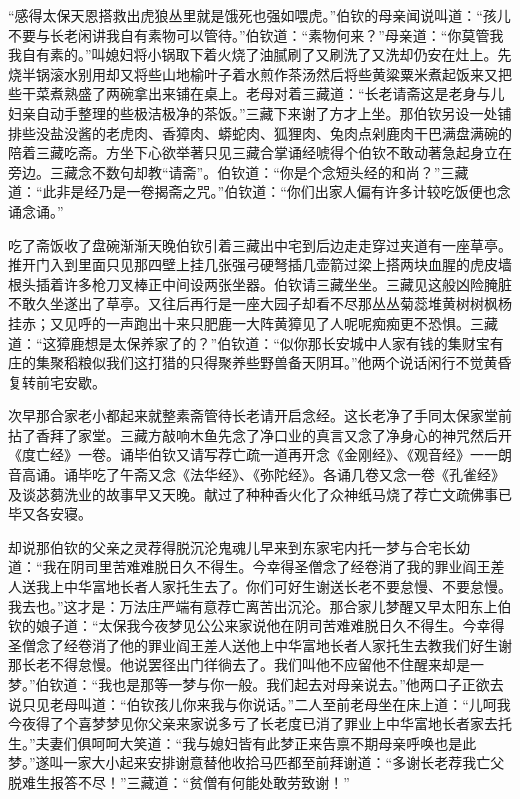 \documentclass[12pt,UTF8]{ctexbook}
\begin{document}
{“感得太保天恩搭救出虎狼丛里就是饿死也强如喂虎。”伯钦的母亲闻说叫道：“孩儿不要与长老闲讲我自有素物可以管待。”伯钦道：“素物何来？”母亲道：“你莫管我我自有素的。”叫媳妇将小锅取下着火烧了油腻刷了又刷洗了又洗却仍安在灶上。先烧半锅滚水别用却又将些山地榆叶子着水煎作茶汤然后将些黄粱粟米煮起饭来又把些干菜煮熟盛了两碗拿出来铺在桌上。老母对着三藏道：“长老请斋这是老身与儿妇亲自动手整理的些极洁极净的茶饭。”三藏下来谢了方才上坐。那伯钦另设一处铺排些没盐没酱的老虎肉、香獐肉、蟒蛇肉、狐狸肉、兔肉点剁鹿肉干巴满盘满碗的陪着三藏吃斋。方坐下心欲举著只见三藏合掌诵经唬得个伯钦不敢动著急起身立在旁边。三藏念不数句却教“请斋”。伯钦道：“你是个念短头经的和尚？”三藏道：“此非是经乃是一卷揭斋之咒。”伯钦道：“你们出家人偏有许多计较吃饭便也念诵念诵。”

吃了斋饭收了盘碗渐渐天晚伯钦引着三藏出中宅到后边走走穿过夹道有一座草亭。推开门入到里面只见那四壁上挂几张强弓硬弩插几壶箭过梁上搭两块血腥的虎皮墙根头插着许多枪刀叉棒正中间设两张坐器。伯钦请三藏坐坐。三藏见这般凶险腌脏不敢久坐遂出了草亭。又往后再行是一座大园子却看不尽那丛丛菊蕊堆黄树树枫杨挂赤；又见呼的一声跑出十来只肥鹿一大阵黄獐见了人呢呢痴痴更不恐惧。三藏道：“这獐鹿想是太保养家了的？”伯钦道：“似你那长安城中人家有钱的集财宝有庄的集聚稻粮似我们这打猎的只得聚养些野兽备天阴耳。”他两个说话闲行不觉黄昏复转前宅安歇。

次早那合家老小都起来就整素斋管待长老请开启念经。这长老净了手同太保家堂前拈了香拜了家堂。三藏方敲响木鱼先念了净口业的真言又念了净身心的神咒然后开《度亡经》一卷。诵毕伯钦又请写荐亡疏一道再开念《金刚经》、《观音经》一一朗音高诵。诵毕吃了午斋又念《法华经》、《弥陀经》。各诵几卷又念一卷《孔雀经》及谈苾蒭洗业的故事早又天晚。献过了种种香火化了众神纸马烧了荐亡文疏佛事已毕又各安寝。

却说那伯钦的父亲之灵荐得脱沉沦鬼魂儿早来到东家宅内托一梦与合宅长幼道：“我在阴司里苦难难脱日久不得生。今幸得圣僧念了经卷消了我的罪业阎王差人送我上中华富地长者人家托生去了。你们可好生谢送长老不要怠慢、不要怠慢。我去也。”这才是：万法庄严端有意荐亡离苦出沉沦。那合家儿梦醒又早太阳东上伯钦的娘子道：“太保我今夜梦见公公来家说他在阴司苦难难脱日久不得生。今幸得圣僧念了经卷消了他的罪业阎王差人送他上中华富地长者人家托生去教我们好生谢那长老不得怠慢。他说罢径出门徉徜去了。我们叫他不应留他不住醒来却是一梦。”伯钦道：“我也是那等一梦与你一般。我们起去对母亲说去。”他两口子正欲去说只见老母叫道：“伯钦孩儿你来我与你说话。”二人至前老母坐在床上道：“儿呵我今夜得了个喜梦梦见你父亲来家说多亏了长老度已消了罪业上中华富地长者家去托生。”夫妻们俱呵呵大笑道：“我与媳妇皆有此梦正来告禀不期母亲呼唤也是此梦。”遂叫一家大小起来安排谢意替他收拾马匹都至前拜谢道：“多谢长老荐我亡父脱难生报答不尽！”三藏道：“贫僧有何能处敢劳致谢！”

}
\end{document}
